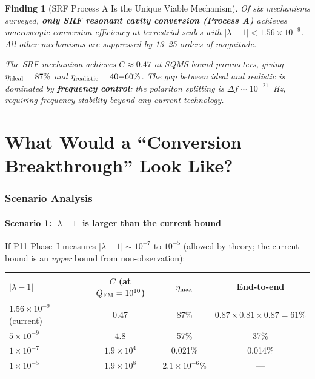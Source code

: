 \documentclass[11pt]{article}
\newtheorem{finding}{Finding}
\newcommand{\ee}[1]{\times 10^{#1}}
\newcommand{\lambdaone}{|\lambda{-}1|}
\newcommand{\QEM}{Q_{\rm EM}}
\begin{document}
\begin{finding}[SRF Process A Is the Unique Viable Mechanism]
\label{find:unique-mechanism}
Of six mechanisms surveyed, \textbf{only SRF resonant cavity conversion
(Process A)} achieves macroscopic conversion efficiency at terrestrial
scales with $\lambdaone < 1.56\ee{-9}$. All other mechanisms are
suppressed by 13--25 orders of magnitude.

The SRF mechanism achieves $C \approx 0.47$ at SQMS-bound parameters,
giving $\eta_{\rm ideal} = 87\%$ and $\eta_{\rm realistic} = 40{-}60\%$.
The gap between ideal and realistic is dominated by \textbf{frequency
control}: the polariton splitting is $\Delta f \sim 10^{-21}$~Hz,
requiring frequency stability beyond any current technology.
\end{finding}

\part{What Would a ``Conversion Breakthrough'' Look Like?}
\label{part:breakthrough}

\section{Scenario Analysis}
\label{sec:scenarios}

\subsection{Scenario 1: $\lambdaone$ is larger than the current bound}

If P11 Phase~I measures $\lambdaone \sim 10^{-7}$ to $10^{-5}$
(allowed by theory; the current bound is an \emph{upper} bound from
non-observation):

\begin{center}
\begin{tabular}{lccc}
\toprule
$\lambdaone$ & $C$ (at $\QEM = 10^{10}$) & $\eta_{\rm max}$ & End-to-end \\
\midrule
$1.56\ee{-9}$ (current) & 0.47 & 87\% & $0.87\times 0.81\times 0.87 = 61\%$ \\
$5\ee{-9}$ & 4.8 & 57\% & 37\% \\
$1\ee{-7}$ & $1.9\ee{4}$ & 0.021\% & 0.014\% \\
$1\ee{-5}$ & $1.9\ee{8}$ & $2.1\ee{-6}\%$ & --- \\
\bottomrule
\end{tabular}
\end{center}
\end{document}
